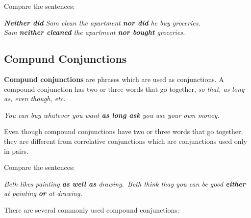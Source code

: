 \documentclass[hidelinks,10pt,a4paper]{article}
\begin{document}
Compare the sentences:

\begin{center}
	\textit{\textbf{Neither did} Sam clean the apartment \textbf{nor did} he buy groceries.\\
	Sam \textbf{neither cleaned} the apartment \textbf{nor bought} groceries.}
\end{center}

\subsection{Compund Conjunctions}
\textbf{Compund conjunctions} are phrases which are used as conjunctions. A compound conjunction has two or three words that go together, \textit{so that, as long as, even though, etc.}

\begin{center}
	\textit{You can buy whatever you want \textbf{as long ask} you use your own money.}
\end{center}

Even though compound conjunctions have two or three words that go together, they are different from correlative conjunctions which are conjunctions used only in pairs.

Compare the sentences:

\begin{center}
	\textit{Beth likes painting \textbf{as well as} drawing.\
	Beth think thay you can be good \textbf{either} at painting \textbf{or} at drawing.}
\end{center}

There are several commonly used compound conjunctions:
\end{document}
